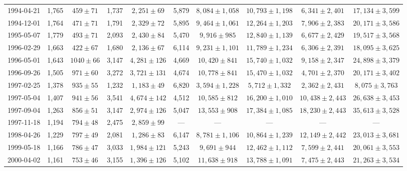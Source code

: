 \begin{landscape}
\begin{longtable}{cccccccccc}
{1994-04-21} & 1,765 & {$459  \pm  71$} & 1,737 & {$2,251 \pm 69$} & 5,879 & {$8,084 \pm 1,058$} & {$10,793 \pm 1,198$} & {$6,341 \pm 2,401$} & {$17,134 \pm 3,599$} \\
{1994-12-01} & 1,764 & {$471  \pm  71$} & 1,791 & {$2,329 \pm 72$} & 5,895 & {$9,464 \pm 1,061$} & {$12,264 \pm 1,203$} & {$7,906 \pm 2,383$} & {$20,171 \pm 3,586$} \\
{1995-05-07} & 1,779 & {$493  \pm  71$} & 2,093 & {$2,430 \pm 84$} & 5,470 & {$9,916 \pm 985$} & {$12,840 \pm 1,139$} & {$6,677 \pm 2,429$} & {$19,517 \pm 3,568$} \\
{1996-02-29} & 1,663 & {$422  \pm  67$} & 1,680 & {$2,136 \pm 67$} & 6,114 & {$9,231 \pm 1,101$} & {$11,789 \pm 1,234$} & {$6,306 \pm 2,391$} & {$18,095 \pm 3,625$} \\
{1996-05-01} & 1,643 & {$1040  \pm  66$} & 3,147 & {$4,281 \pm 126$} & 4,669 & {$10,420 \pm 841$} & {$15,740 \pm 1,032$} & {$9,158 \pm 2,347$} & {$24,898 \pm 3,379$} \\
{1996-09-26} & 1,505 & {$971  \pm  60$} & 3,272 & {$3,721 \pm 131$} & 4,674 & {$10,778 \pm 841$} & {$15,470 \pm 1,032$} & {$4,701 \pm 2,370$} & {$20,171 \pm 3,402$} \\
{1997-02-25} & 1,378 & {$935  \pm  55$} & 1,232 & {$1,183 \pm 49$} & 6,820 & {$3,594 \pm 1,228$} & {$5,712 \pm 1,332$} & {$2,362 \pm 2,431$} & {$8,075 \pm 3,763$} \\
{1997-05-04} & 1,407 & {$941  \pm  56$} & 3,541 & {$4,674 \pm 142$} & 4,512 & {$10,585 \pm 812$} & {$16,200 \pm 1,010$} & {$10,438 \pm 2,443$} & {$26,638 \pm 3,453$} \\
{1997-09-04} & 1,263 & {$856  \pm  51$} & 3,147 & {$2,974 \pm 126$} & 5,047 & {$13,553 \pm 908$} & {$17,384 \pm 1,085$} & {$18,230 \pm 2,443$} & {$35,613 \pm 3,528$} \\
{1997-11-18} & 1,194 & {$794  \pm  48$} & 2,475 & {$2,859 \pm 99$} & --- & --- & --- & --- & --- \\
{1998-04-26} & 1,229 & {$797  \pm  49$} & 2,081 & {$1,286 \pm 83$} & 6,147 & {$8,781 \pm 1,106$} & {$10,864 \pm 1,239$} & {$12,149 \pm 2,442$} & {$23,013 \pm 3,681$} \\
{1999-05-18} & 1,166 & {$786  \pm  47$} & 3,033 & {$1,984 \pm 121$} & 5,243 & {$9,691 \pm 944$} & {$12,462 \pm 1,112$} & {$7,599 \pm 2,441$} & {$20,061 \pm 3,553$} \\
{2000-04-02} & 1,161 & {$753  \pm  46$} & 3,155 & {$1,396 \pm 126$} & 5,102 & {$11,638 \pm 918$} & {$13,788 \pm 1,091$} & {$7,475 \pm 2,443$} & {$21,263 \pm 3,534$} \\

\end{longtable}
\end{landscape}
